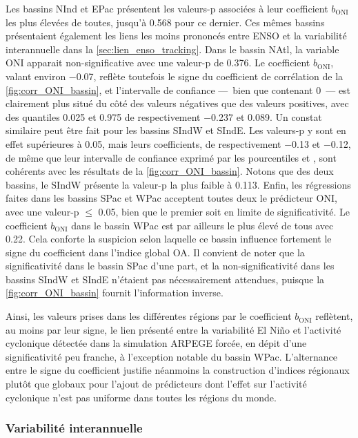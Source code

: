 \documentclass[../main.tex]{subfiles}
\begin{document}
Les bassins NInd et EPac présentent les valeurs-p associées à leur coefficient $b_{\mathrm{ONI}}$ les plus élevées de toutes, jusqu'à \num{0.568} pour ce
dernier. Ces mêmes bassins présentaient également les liens les moins prononcés entre ENSO et la variabilité interannuelle dans la
\cref{sec:lien_enso_tracking}. Dans le bassin NAtl, la variable ONI apparait non-significative avec une valeur-p de \num{0.376}. Le coefficient
$b_{\mathrm{ONI}}$, valant environ \num{-0.07}, reflète toutefois le signe du coefficient de corrélation de la \cref{fig:corr_ONI_bassin}, et l'intervalle de
confiance ---~bien que contenant \num{0}~--- est clairement plus situé du côté des valeurs négatives que des valeurs positives, avec des quantiles
\num{0.025} et \num{0.975} de respectivement \num{-0.237} et \num{0.089}. Un constat similaire peut être fait pour les bassins SIndW et SIndE. Les valeurs-p y
sont en effet supérieures à \num{0.05}, mais leurs coefficients, de respectivement \num{-0.13} et \num{-0.12}, de même que leur intervalle de confiance exprimé
par les pourcentiles  et , sont cohérents avec les résultats de la \cref{fig:corr_ONI_bassin}. Notons que des deux bassins, le SIndW
présente la valeur-p la plus faible à \num{0.113}. Enfin, les régressions faites dans les bassins SPac et WPac acceptent toutes deux le prédicteur ONI, avec une
valeur-p $\leq$ \num{0.05}, bien que le premier soit en limite de significativité. Le coefficient $b_{\mathrm{ONI}}$ dans le bassin WPac est par ailleurs le
plus élevé de tous avec \num{0.22}. Cela conforte la suspicion selon laquelle ce bassin influence fortement le signe du coefficient dans l'indice global OA. Il
convient de noter que la significativité dans le bassin SPac d'une part, et la non-significativité dans les bassins SIndW et SIndE n'étaient pas nécessairement
attendues, puisque la \cref{fig:corr_ONI_bassin} fournit l'information inverse. 

Ainsi, les valeurs prises dans les différentes régions par le coefficient $b_{\mathrm{ONI}}$ reflètent, au moins par leur signe, le lien présenté entre la
variabilité El Niño et l'activité cyclonique détectée dans la simulation ARPEGE forcée, en dépit d'une significativité peu franche, à l'exception notable du
bassin WPac. L'alternance entre le signe du coefficient justifie néanmoins la construction d'indices régionaux plutôt que globaux pour l'ajout de prédicteurs
dont l'effet sur l'activité cyclonique n'est pas uniforme dans toutes les régions du monde.

\subsubsection{Variabilité interannuelle}
\end{document}
